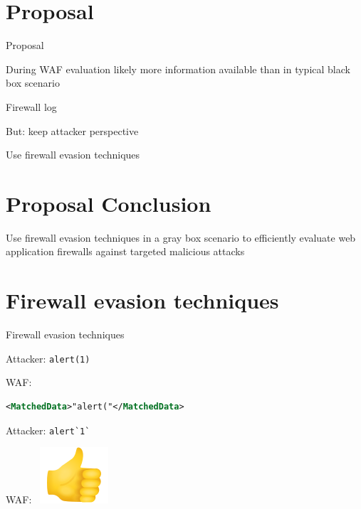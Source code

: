 \documentclass[aspectratio=169]{beamer}
\newcommand{\supertext}[1]{\fontsize{30}{40}\selectfont #1}
\begin{document}
\section{Proposal}
\begin{frame}[fragile]{Proposal}
	\begin{vfilleditems}
		\item<2-> During WAF evaluation likely more information available than in typical black box scenario
		\item<3-> Firewall log
		\item<4-> But: keep attacker perspective
		\item<5-> Use firewall evasion techniques
	\end{vfilleditems}
\end{frame}

\section*{Proposal Conclusion}
\begin{frame}
	\centering
	\vfill
	\supertext{Use firewall evasion techniques in a gray box scenario to efficiently evaluate web application firewalls against targeted malicious attacks}
	\vfill
\end{frame}

\section{Firewall evasion techniques}
\begin{frame}[fragile]{Firewall evasion techniques}
	\begin{vfilleditems}
		\item<2-> Attacker: \verb|alert(1)|
		\item<3-> WAF:
		\begin{lstlisting}[style=ruleStyle, language=XML]
<MatchedData>"alert("</MatchedData>
\end{lstlisting}
		\item<4-> Attacker: \verb|alert`1`|
		\item<5-> WAF: \  \includegraphics[width=.07\linewidth]{thumbsup.png}
	\end{vfilleditems}
\end{frame}
\end{document}

